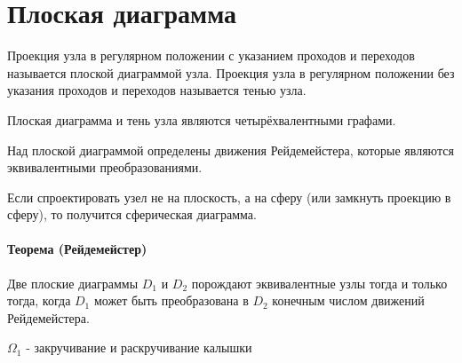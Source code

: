 \section{Плоская диаграмма}

Проекция узла в регулярном положении с указанием проходов и переходов называется плоской диаграммой узла.
Проекция узла в регулярном положении без указания проходов и переходов называется тенью узла. 

Плоская диаграмма и тень узла являются четырёхвалентными графами.

Над плоской диаграммой определены движения Рейдемейстера, которые являются эквивалентными преобразованиями.

Если спроектировать узел не на плоскость, а на сферу (или замкнуть проекцию в сферу), то получится сферическая диаграмма.

\paragraph{Теорема (Рейдемейстер)} Две плоские диаграммы $D_1$ и $D_2$ порождают эквивалентные узлы тогда и только тогда, когда $D_1$ может быть преобразована в $D_2$ конечным числом движений Рейдемейстера.



\graphicspath{{\currentpath}}

$\Omega_1$ - закручивание и раскручивание калышки

